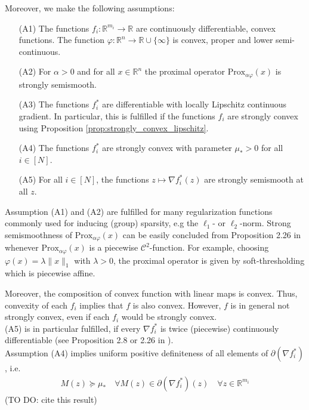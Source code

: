 \documentclass[12pt,a4paper,twoside]{article}
\theoremstyle{plain}
\theoremstyle{note}
\numberwithin{thm}{section}
\newcommand{\prox}[2]{\text{Prox}_{#1}\left(#2\right)}
\let\temp\phi
\let\phi\varphi
\let\varphi\temp
\begin{document}
	Moreover, we make the following assumptions:
	\begin{enumerate}
		\item[(A1)] The functions $f_i: \mathbb{R}^{m_i} \to \mathbb{R}$ are continuously differentiable, convex functions. The function $\phi: \mathbb{R}^n \to \mathbb{R}\cup \{\infty\}$ is convex, proper and lower semi-continuous.
		\item[(A2)] For $\alpha > 0$ and for all $x\in \mathbb{R}^n$ the proximal operator $\prox{\alpha \phi}{x}$ is strongly semismooth.
		\item[(A3)] The functions $f_i^\ast$ are differentiable with locally Lipschitz continuous gradient. In particular, this is fulfilled if the functions $f_i$ are strongly convex using Proposition \ref{prop:strongly_convex_lipschitz}.
		\item[(A4)] The functions $f_i^\ast$ are strongly convex with parameter $\mu_\ast > 0$ for all $i \in [N]$.
		\item[(A5)] For all $i \in [N]$, the functions $z \mapsto \nabla f^\ast_i(z)$ are strongly semismooth at all $z$.
	\end{enumerate}
	\vspace{10mm}
	
	
	
	
	Assumption (A1) and (A2) are fulfilled for many regularization functions commonly used for inducing (group) sparsity, e.g the $\ell_1$- or $\ell_2$-norm. Strong semismoothness of $\prox{\alpha \phi}{x}$ can be easily concluded from Proposition 2.26 in \cite{Ulbrich2011} whenever $\prox{\alpha \phi}{x}$ is a piecewise $\mathcal{C}^2$-function. For example, choosing $\phi(x) = \lambda \|x\|_1$ with $\lambda > 0$, the proximal operator is given by soft-thresholding which is piecewise affine. 
	
	Moreover, the composition of convex function with linear maps is convex. Thus, convexity of each $f_i$ implies that $f$ is also convex.  However, $f$ is in general not strongly convex, even if each $f_i$ would be strongly convex.\\
	
	(A5) is in particular fulfilled, if every $\nabla f^\ast_i$ is twice (piecewise) continuously differentiable (see Proposition 2.8 or 2.26 in \cite{Ulbrich2011}).\\
	
	Assumption (A4) implies uniform positive definiteness of all elements of $\partial (\nabla f^\ast_i)$, i.e.
	\begin{align*}
		M(z) \succeq \mu_\ast  \quad \forall M(z) \in \partial (\nabla f^\ast_i)(z) \quad \forall z \in \mathbb{R}^{m_i} 
	\end{align*}
	(TO DO: cite this result)
	
\end{document}
